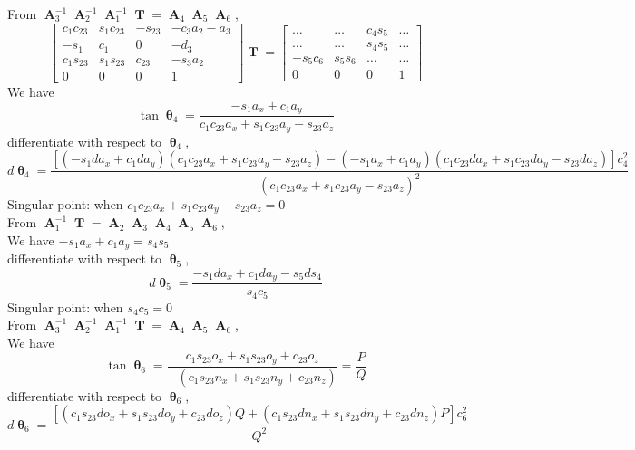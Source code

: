 \documentclass[12pt]{article}
\DeclareMathOperator{\A}{\mathbf{A}}
\DeclareMathOperator{\T}{\mathbf{T}}
\DeclareMathOperator{\Th}{\mathbf{\theta}}
\begin{document}
From $\A_3^{-1}\A_2^{-1}\A_1^{-1}\T = \A_4\A_5\A_6$,
$$\begin{bmatrix}
    c_1c_{23} & s_1c_{23} & -s_{23} & -c_3a_2-a_3\\
    -s_1 & c_1 & 0 & -d_3\\
    c_1s_{23} & s_1s_{23} & c_{23} & -s_3a_2\\
    0 & 0 & 0 & 1
  \end{bmatrix} \T =
  \begin{bmatrix}
    \dots & \dots & c_4s_5 & \dots\\
    \dots & \dots & s_4s_5 & \dots\\
    -s_5c_6 & s_5s_6 & \dots & \dots\\
    0 & 0 & 0 & 1
  \end{bmatrix}$$
We have $$\tan\Th_4 = \frac{-s_1a_x+c_1a_y}{c_1c_{23}a_x+s_1c_{23}a_y-s_{23}a_z}$$
differentiate with respect to $\Th_4$,
$$d\Th_4=\frac{[(-s_1da_x+c_1da_y)(c_1c_{23}a_x+s_1c_{23}a_y-s_{23}a_z)-(-s_1a_x+c_1a_y)(c_1c_{23}da_x+s_1c_{23}da_y-s_{23}da_z)]c_4^2}{(c_1c_{23}a_x+s_1c_{23}a_y-s_{23}a_z)^2}$$
Singular point: when $c_1c_{23}a_x+s_1c_{23}a_y-s_{23}a_z = 0$\\
From $\A_1^{-1}\T = \A_2\A_3\A_4\A_5\A_6$,\\
We have $-s_1a_x+c_1a_y = s_4s_5$\\
differentiate with respect to $\Th_5$,
$$d\Th_5=\frac{-s_1da_x+c_1da_y-s_5ds_4}{s_4c_5}$$
Singular point: when $s_4c_5 = 0$\\
From $\A_3^{-1}\A_2^{-1}\A_1^{-1}\T = \A_4\A_5\A_6$,\\
We have $$\tan\Th_6 = \frac{c_1s_{23}o_x+s_1s_{23}o_y+c_{23}o_z}{-(c_1s_{23}n_x+s_1s_{23}n_y+c_{23}n_z)} = \frac{P}{Q}$$
differentiate with respect to $\Th_6$,
$$d\Th_6=\frac{[(c_1s_{23}do_x+s_1s_{23}do_y+c_{23}do_z)Q+(c_1s_{23}dn_x+s_1s_{23}dn_y+c_{23}dn_z)P]c_6^2}{Q^2}$$
\end{document}
